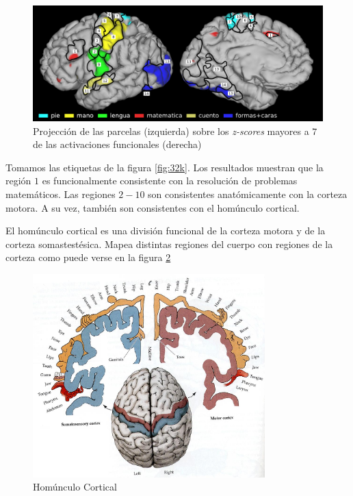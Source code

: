 \begin{figure}[h!]
    \includegraphics[width=\textwidth]{img/32k_z7.png}
    \caption{Projecci\'on de las parcelas (izquierda) sobre los \textit{z-scores}
    mayores a $7$ de las activaciones funcionales (derecha)}
    \label{fig:32k_z7}
\end{figure}


Tomamos las etiquetas de la figura \ref{fig:32k}. Los resultados muestran que 
la regi\'on $1$ es funcionalmente consistente con la resoluci\'on de problemas
matem\'aticos. Las regiones $2-10$ son consistentes anat\'omicamente con la corteza motora. A su vez, tambi\'en son consistentes con el hom\'unculo cortical.

El hom\'unculo cortical es una 
divisi\'on funcional de la corteza motora y de la corteza somastest\'esica.
Mapea distintas regiones del cuerpo con regiones de la corteza como puede
verse en la figura \ref{fig:homunculo}

\begin{figure}[h!]
    \includegraphics[width=0.8\textwidth]{img/homunculus.jpg}
    \caption{Hom\'unculo Cortical}
    \label{fig:homunculo}
\end{figure}


